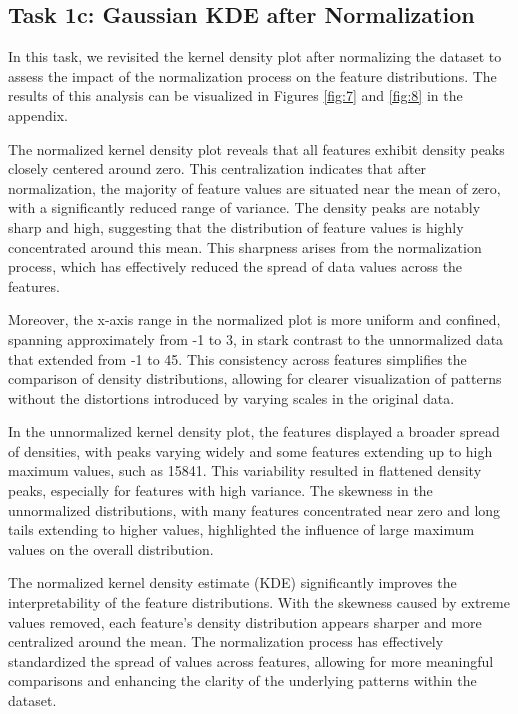 \documentclass[a4paper,oneside,bibliography=totoc]{scrartcl}
\begin{document}
\subsection{Task 1c: Gaussian KDE after Normalization}

In this task, we revisited the kernel density plot after normalizing the dataset to assess the impact of the normalization process on the feature distributions. The results of this analysis can be visualized in Figures \ref{fig:7} and \ref{fig:8} in the appendix.

The normalized kernel density plot reveals that all features exhibit density peaks closely centered around zero. This centralization indicates that after normalization, the majority of feature values are situated near the mean of zero, with a significantly reduced range of variance. The density peaks are notably sharp and high, suggesting that the distribution of feature values is highly concentrated around this mean. This sharpness arises from the normalization process, which has effectively reduced the spread of data values across the features.

Moreover, the x-axis range in the normalized plot is more uniform and confined, spanning approximately from -1 to 3, in stark contrast to the unnormalized data that extended from -1 to 45. This consistency across features simplifies the comparison of density distributions, allowing for clearer visualization of patterns without the distortions introduced by varying scales in the original data. 

In the unnormalized kernel density plot, the features displayed a broader spread of densities, with peaks varying widely and some features extending up to high maximum values, such as 15841. This variability resulted in flattened density peaks, especially for features with high variance. The skewness in the unnormalized distributions, with many features concentrated near zero and long tails extending to higher values, highlighted the influence of large maximum values on the overall distribution.

The normalized kernel density estimate (KDE) significantly improves the interpretability of the feature distributions. With the skewness caused by extreme values removed, each feature's density distribution appears sharper and more centralized around the mean. The normalization process has effectively standardized the spread of values across features, allowing for more meaningful comparisons and enhancing the clarity of the underlying patterns within the dataset.
\end{document}
